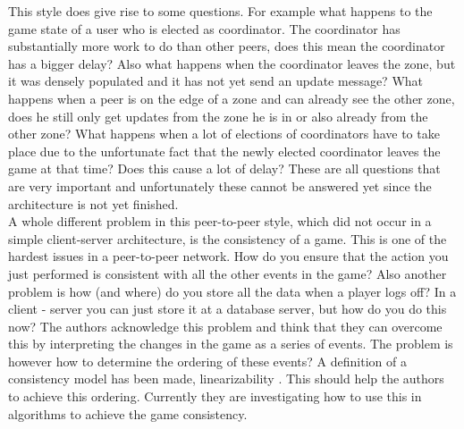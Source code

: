 This style does give rise to some questions. 
For example what happens to the game state of a user who is elected as coordinator. 
The coordinator has substantially more work to do than other peers, does this mean the coordinator has a bigger delay? 
Also what happens when the coordinator leaves the zone, but it was densely populated and it has not yet send an update message? 
What happens when a peer is on the edge of a zone and can already see the other zone, does he still only get updates from the zone he is in or also already from the other zone? 
What happens when a lot of elections of coordinators have to take place due to the unfortunate fact that the newly elected coordinator leaves the game at that time? 
Does this cause a lot of delay? 
These are all questions that are very important and unfortunately these cannot be answered yet since the architecture is not yet finished. \\

A whole different problem in this peer-to-peer style, which did not occur in a simple client-server architecture, is the consistency of a game. 
This is one of the hardest issues in a peer-to-peer network. 
How do you ensure that the action you just performed is consistent with all the other events in the game?
Also another problem is how (and where) do you store all the data when a player logs off?
In a client - server you can just store it at a database server, but how do you do this now? 
The authors acknowledge this problem and think that they can overcome this by interpreting the changes in the game as a series of events. 
The problem is however how to determine the ordering of these events? 
A definition of a consistency model has been made, linearizability \cite{linear}. 
This should help the authors to achieve this ordering. 
Currently they are investigating how to use this in algorithms to achieve the game consistency.\\

